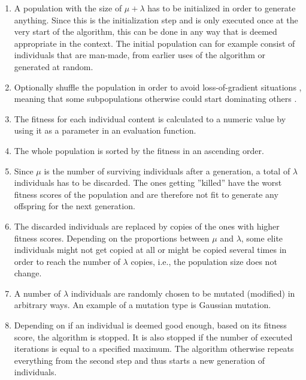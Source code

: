 \begin{enumerate}
    \item A population with the size of $\mu + \lambda$ has to be initialized in order to generate anything. Since this is the initialization step and is only executed once at the very start of the algorithm, this can be done in any way that is deemed appropriate in the context. The initial population can for example consist of individuals that are man-made, from earlier uses of the algorithm or generated at random.
    \item Optionally shuffle the population in order to avoid loss-of-gradient situations \cite{shaker2016procedural}, meaning that some subpopulations otherwise could start dominating others \cite{Spatial-Embedding-and-Loss-of-Gradient}.
    \item The fitness for each individual content is calculated to a numeric value by using it as a parameter in an evaluation function.
    \item The whole population is sorted by the fitness in an ascending order.
    \item Since $\mu$ is the number of surviving individuals after a generation, a total of $\lambda$ individuals has to be discarded. The ones getting ''killed'' have the worst fitness scores of the population and are therefore not fit to generate any offspring for the next generation.
    \item The discarded individuals are replaced by copies of the ones with higher fitness scores. Depending on the proportions between $\mu$ and $\lambda$, some elite individuals might not get copied at all or might be copied several times in order to reach the number of $\lambda$ copies, i.e., the population size does not change.
    \item A number of $\lambda$ individuals are randomly chosen to be mutated (modified) in arbitrary ways. An example of a mutation type is Gaussian mutation.
    \item Depending on if an individual is deemed good enough, based on its fitness score, the algorithm is stopped. It is also stopped if the number of executed iterations is equal to a specified maximum. The algorithm otherwise repeats everything from the second step and thus starts a new generation of individuals.
\end{enumerate}

